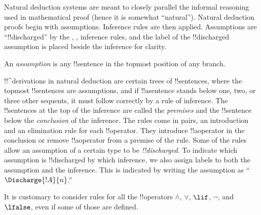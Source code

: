 \documentclass[../../../include/open-logic-section]{subfiles}
\begin{document}
      {}
      {}

\begin{explain}
Natural deduction systems are meant to closely parallel the informal
reasoning used in mathematical proof (hence it is somewhat
``natural''). Natural deduction proofs begin with assumptions.
Inference rules are then applied. Assumptions are ``!!{discharged}''
by the \Intro{\lnot}, \Intro{\lif},  inference rules, and the label of
the !!{discharged} assumption is placed beside the inference for
clarity.
\end{explain}

\begin{defn}[Assumption]
An \emph{assumption} is any !!{sentence}
in the topmost position of any branch.
\end{defn}

!!^{derivation}s in natural deduction are certain trees of
!!{sentence}s, where the topmost !!{sentence}s are assumptions, and if
!!a{sentence} stands below one, two, or three other sequents, it must
follow correctly by a rule of inference. The !!{sentence}s at the top
of the inference are called the \emph{premises} and the !!{sentence}
below the \emph{conclusion} of the inference.  The rules come in
pairs, an introduction and an elimination rule for each
!!{operator}. They introduce !!a{operator} in the conclusion or
remove !!a{operator} from a premise of the rule.  Some of the rules
allow an assumption of a certain type to be \emph{!!{discharged}}. To
indicate which assumption is !!{discharged} by which inference, we
also assign labels to both the assumption and the inference.  This is
indicated by writing the assumption as ``$\Discharge{!A}{n}$.''


%
	{It is customary to consider rules for all the !!{operator}s $\land$, $\lor$, $\lif$, $\lnot$, and $\lfalse$, even if some of those are defined.}
\end{document}

